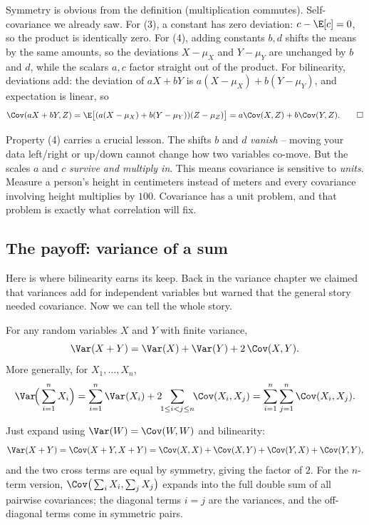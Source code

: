 \begin{whybox}
Symmetry is obvious from the definition (multiplication commutes). Self-covariance
we already saw. For (3), a constant has zero deviation: $c - \E[c] = 0$, so the
product is identically zero. For (4), adding constants $b, d$ shifts the means by
the same amounts, so the deviations $X - \mu_X$ and $Y - \mu_Y$ are unchanged by
$b$ and $d$, while the scalars $a, c$ factor straight out of the product. For
bilinearity, deviations add: the deviation of $aX + bY$ is
$a(X-\mu_X) + b(Y-\mu_Y)$, and expectation is linear, so
\[
\Cov(aX+bY, Z) = \E\big[(a(X-\mu_X)+b(Y-\mu_Y))(Z-\mu_Z)\big]
= a\Cov(X,Z) + b\Cov(Y,Z). \qedhere
\]
\end{whybox}

\begin{intuitionbox}
Property (4) carries a crucial lesson. The shifts $b$ and $d$ \emph{vanish} -- moving
your data left/right or up/down cannot change how two variables co-move. But the
scales $a$ and $c$ \emph{survive and multiply in}. This means covariance is
sensitive to \emph{units}. Measure a person's height in centimeters instead of
meters and every covariance involving height multiplies by $100$. Covariance has a
unit problem, and that problem is exactly what correlation will fix.
\end{intuitionbox}

\subsection{The payoff: variance of a sum}

Here is where bilinearity earns its keep. Back in the variance chapter we claimed
that variances add for independent variables but warned that the general story
needed covariance. Now we can tell the whole story.

\begin{theorem}
\label{ch14:var-sum}
For any random variables $X$ and $Y$ with finite variance,
\[
\Var(X + Y) = \Var(X) + \Var(Y) + 2\,\Cov(X, Y).
\]
More generally, for $X_1, \dots, X_n$,
\[
\Var\!\Big(\sum_{i=1}^n X_i\Big)
= \sum_{i=1}^n \Var(X_i) + 2\!\!\sum_{1 \le i < j \le n}\!\! \Cov(X_i, X_j)
= \sum_{i=1}^n \sum_{j=1}^n \Cov(X_i, X_j).
\]
\end{theorem}

\begin{whybox}
Just expand using $\Var(W) = \Cov(W, W)$ and bilinearity:
\[
\Var(X+Y) = \Cov(X+Y, X+Y)
= \Cov(X,X) + \Cov(X,Y) + \Cov(Y,X) + \Cov(Y,Y),
\]
and the two cross terms are equal by symmetry, giving the factor of $2$. For the
$n$-term version, $\Cov\big(\sum_i X_i, \sum_j X_j\big)$ expands into the full
double sum of all pairwise covariances; the diagonal terms $i = j$ are the
variances, and the off-diagonal terms come in symmetric pairs.
\end{whybox}

